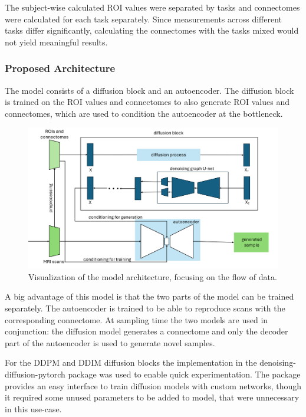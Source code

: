 	The subject-wise calculated ROI values were separated by tasks and connectomes were calculated for each task separately. Since measurements across different tasks differ significantly, calculating the connectomes with the tasks mixed would not yield meaningful results.
	
	\subsubsection{Proposed Architecture}
	
	The model consists of a diffusion block and an autoencoder. The diffusion block is trained on the ROI values and connectomes to also generate ROI values and connectomes, which are used to condition the autoencoder at the bottleneck.
	
	\begin{figure}[!h]
		\centering
		\includegraphics[width=\textwidth]{figures/architecture.png}
		\caption{Visualization of the model architecture, focusing on the flow of data.}
	\end{figure}
	
	A big advantage of this model is that the two parts of the model can be trained separately. The autoencoder is trained to be able to reproduce scans with the corresponding connectome. At sampling time  the two models are used in conjunction: the diffusion model generates a connectome and only the decoder part of the autoencoder is used to generate novel samples.
	
	For the DDPM and DDIM diffusion blocks the implementation in the denoising-diffusion-pytorch package was used to enable quick experimentation. The package provides an easy interface to train diffusion models with custom networks, though it required some unused parameters to be added to model, that were unnecessary in this use-case.
	
